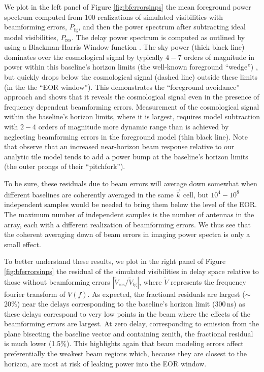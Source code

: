 We plot in the left panel of Figure \ref{fig:bferrorsinps} the mean foreground power spectrum computed from 100 realizations of simulated visibilities with beamforming errors, $P_\mathrm{fg}$, and then the power spectrum after subtracting ideal model visibilities, $P_\mathrm{res}$. The delay power spectrum is computed as outlined by \citet{nithya15} using a Blackman-Harris Window function \citep{parsons12a,parsons12b}. The sky power (thick black line) dominates over the cosmological signal by typically $4-7$ orders of magnitude in power within this baseline's horizon limits (the well-known foreground ``wedge'') \citep{Dattapowerspec,X13, pober13,MoralesPSShapes, VedanthamWedge, nithya13, CathWedge, AdrianWedge1, AdrianWedge2}, but quickly drops below the cosmological signal (dashed line) \citep{21cmfast} outside these limits (in the the ``EOR window''). This demonstrates the ``foreground avoidance'' approach and shows that it reveals the cosmological signal even in the presence of frequency dependent beamforming errors. Measurement of the cosmological signal within the baseline's horizon limits, where it is largest, requires model subtraction with $2-4$ orders of magnitude more dynamic range than is achieved by neglecting beamforming errors in the foreground model (thin black line). Note that \citet{nithya15,nithya15b} observe that an increased near-horizon beam response relative to our analytic tile model tends to add a power bump at the baseline's horizon limits (the outer prongs of their ``pitchfork'').

To be sure, these residuals due to beam errors will average down somewhat when different baselines are coherently averaged in the same $\vec{k}$ cell, but $10^4-10^8$ independent samples would be needed to bring them below the level of the EOR. The maximum number of independent samples is the number of antennas in the array, each with a different realization of beamforming errors. We thus see that the coherent averaging down of beam errors in imaging power spectra is only a small effect.

To better understand these results, we plot in the right panel of Figure \ref{fig:bferrorsinps} the residual of the simulated visibilities in delay space relative to those without beamforming errors $|\widetilde{V}_\mathrm{res}/\widetilde{V}_\mathrm{fg}|$, where $\widetilde{V}$ represents the frequency fourier transform of $V(f)$. As expected, the fractional residuals are largest ($\sim$20\%) near the delays corresponding to the baseline's horizon limit (300\,ns) as these delays correspond to very low points in the beam where the effects of the beamforming errors are largest. At zero delay, corresponding to emission from the plane bisecting the baseline vector and containing zenith, the fractional residual is much lower (1.5\%). This highlights again that beam modeling errors affect preferentially the weakest beam regions which, because they are closest to the horizon, are most at risk of leaking power into the EOR window. 

